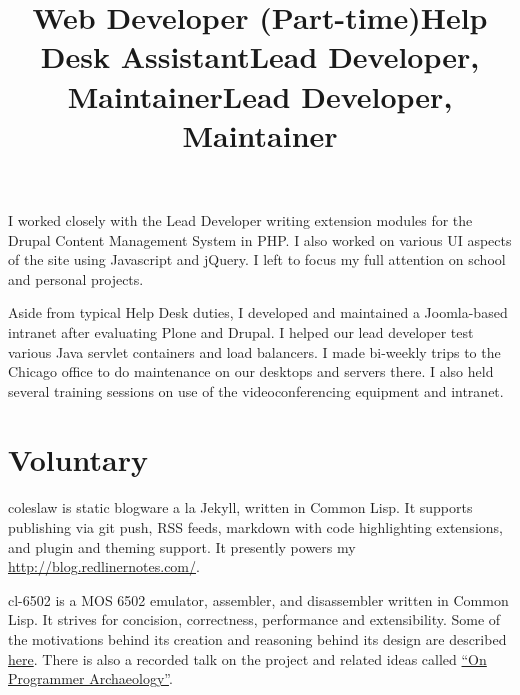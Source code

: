 \documentclass[margintitle,line]{res}
\renewcommand{\subsection}[1]{\section{\normalfont #1}}
\begin{document}
\begin{resume}
\title{Web Developer (Part-time)}
\begin{position}
  I worked closely with the Lead Developer writing extension modules
  for the Drupal Content Management System in PHP. I also worked on
  various UI aspects of the site using Javascript and jQuery.
  I left to focus my full attention on school and personal projects.
\end{position}

\title{Help Desk Assistant}
\begin{position}
  Aside from typical Help Desk duties, I developed and maintained
  a Joomla-based intranet after evaluating Plone and Drupal. I
  helped our lead developer test various Java servlet containers and
  load balancers. I made bi-weekly trips to the Chicago office to do
  maintenance on our desktops and servers there. I also held several
  training sessions on use of the videoconferencing equipment and intranet.
\end{position}


\subsection{Voluntary}


\title{Lead Developer, Maintainer}
\begin{position}
  coleslaw is static blogware a la Jekyll, written in Common Lisp.
  It supports publishing via git push, RSS feeds, markdown with code highlighting extensions,
  and plugin and theming support. It presently powers my
  \href{personal blog}{http://blog.redlinernotes.com/}.
\end{position}

\title{Lead Developer, Maintainer}
\begin{position}
  cl-6502 is a MOS 6502 emulator, assembler, and disassembler written in Common Lisp.
  It strives for concision, correctness, performance and extensibility. Some of the
  motivations behind its creation and reasoning behind its design are described
  \href{http://blog.redlinernotes.com/posts/On-Interactive-Retrocomputing.html}{here}.
  There is also a recorded talk on the project and related ideas called
  \href{http://vimeo.com/redline6561/on-programmer-archaeology}{``On Programmer Archaeology''}.
\end{position}


\end{resume}
\end{document}
